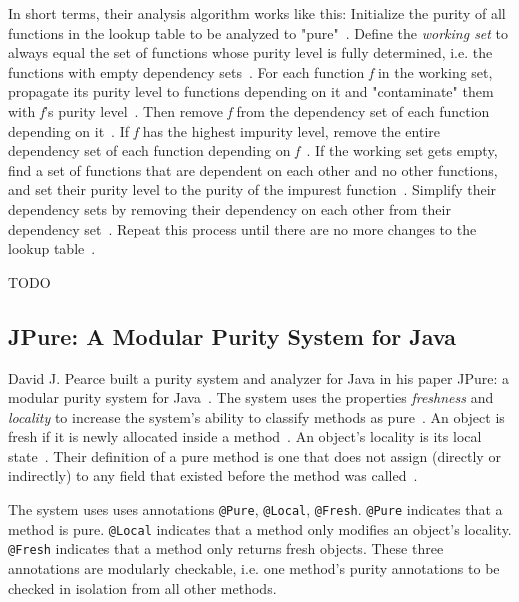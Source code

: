 \documentclass[a4paper,12pt]{article}
\begin{document}
In short terms, their analysis algorithm works like this: Initialize the purity of all functions in the lookup table to be analyzed to "pure"~\cite{pitidis2010purity}. Define the \textit{working set} to always equal the set of functions whose purity level is fully determined, i.e. the functions with empty dependency sets~\cite{pitidis2010purity}. For each function \textit{f} in the working set, propagate its purity level to functions depending on it and "contaminate" them with \textit{f}'s purity level~\cite{pitidis2010purity}. Then remove \textit{f} from the  dependency set of each function depending on it~\cite{pitidis2010purity}. If \textit{f} has the highest impurity level, remove the entire dependency set of each function depending on \textit{f}~\cite{pitidis2010purity}. If the working set gets empty, find a set of functions that are dependent on each other and no other functions, and set their purity level to the purity of the impurest function~\cite{pitidis2010purity}. Simplify their dependency sets by removing their dependency on each other from their dependency set~\cite{pitidis2010purity}. Repeat this process until there are no more changes to the lookup table~\cite{pitidis2010purity}.

TODO


\subsection{JPure: A Modular Purity System for Java} \label{sub:JPure: A Modular Purity System for Java}
David J. Pearce built a purity system and analyzer for Java in his paper JPure: a modular purity system for Java~\cite{pearce2011jpure}. The system uses the properties \textit{freshness} and \textit{locality} to increase the system's ability to classify methods as pure~\cite{pearce2011jpure}. An object is fresh if it is newly allocated inside a method~\cite{pearce2011jpure}. An object's locality is its local state~\cite{pearce2011jpure}. Their definition of a pure method is one that does not assign (directly or indirectly) to any field that existed before the method was called~\cite{pearce2011jpure}.

The system uses uses annotations \texttt{@Pure}, \texttt{@Local}, \texttt{@Fresh}. \texttt{@Pure} indicates that a method is pure. \texttt{@Local} indicates that a method only modifies an object's locality. \texttt{@Fresh} indicates that a method only returns fresh objects. These three annotations are modularly checkable, i.e. one method's purity annotations to be checked in isolation from all other methods.
\end{document}
